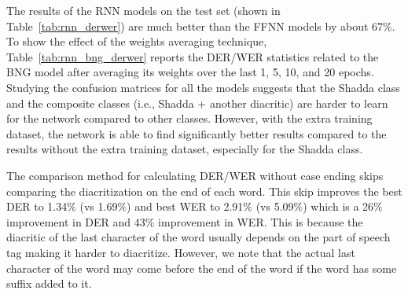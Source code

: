 \documentclass[11pt,a4paper]{article}
\newcommand{\para}[1]{\medskip \noindent {\bf #1}}
\begin{document}
\para{Discussion and Analysis.}
The results of the RNN models on the test set (shown in Table~\ref{tab:rnn_derwer}) are much better than the FFNN models by about 67\%. To show the effect of the weights averaging technique, Table~\ref{tab:rnn_bng_derwer} reports the DER/WER statistics related to the BNG model after averaging its weights over the last 1, 5, 10, and 20 epochs.
Studying the confusion matrices for all the models suggests that the Shadda class and the composite classes (i.e., Shadda + another diacritic) are harder to learn for the network compared to other classes. However, with the extra training dataset, the network is able to find significantly better results compared to the results without the extra training dataset, especially for the Shadda class.

The comparison method for calculating DER/WER without case ending skips comparing the diacritization on the end of each word. This skip improves the best DER to 1.34\% (vs 1.69\%) and best WER to 2.91\% (vs 5.09\%) which is a 26\% improvement in DER and 43\% improvement in WER. This is because the diacritic of the last character of the word usually depends on the part of speech tag making it harder to diacritize. However, we note that the actual last character of the word may come before the end of the word if the word has some suffix added to it.

\begin{table*}[h]
\centering
\caption{Comparing the BNG model with \cite{shakkala} in terms of DER/WER on the test set}
\label{tab:shakkala_derwer}
\end{table*}
\end{document}
